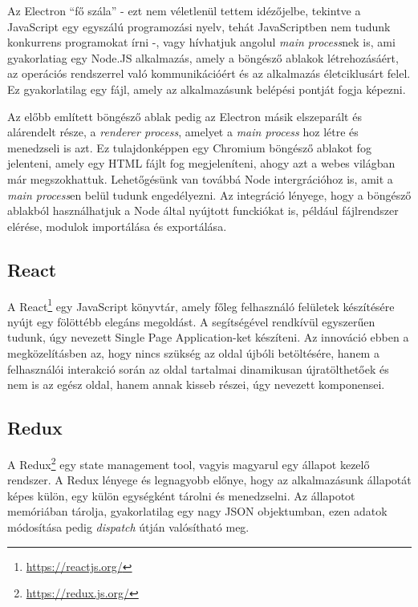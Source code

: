 Az Electron ``fő szála'' - ezt nem véletlenül tettem idézőjelbe, tekintve a JavaScript egy egyszálú programozási nyelv, tehát JavaScriptben nem tudunk konkurrens programokat írni -, vagy hívhatjuk angolul {\it main process}nek is, ami gyakorlatiag egy Node.JS alkalmazás, amely a böngésző ablakok létrehozásáért, az operációs rendszerrel való kommunikációért és az alkalmazás életciklusárt felel. Ez gyakorlatilag egy fájl, amely az alkalmazásunk belépési pontját fogja képezni.

Az előbb említett böngésző ablak pedig az Electron másik elszeparált és alárendelt része, a {\it renderer process}, amelyet a {\it main process} hoz létre és menedzseli is azt. Ez tulajdonképpen egy Chromium böngésző ablakot fog jelenteni, amely egy HTML fájlt fog megjeleníteni, ahogy azt a webes világban már megszokhattuk. Lehetőgésünk van továbbá Node intergrációhoz is, amit a {\it main process}en belül tudunk engedélyezni. Az integráció lényege, hogy a böngésző ablakból használhatjuk a Node által nyújtott funckiókat is, például fájlrendszer elérése, modulok importálása és exportálása.

\subsection{React}
A React\footnote{\url{https://reactjs.org/}} egy JavaScript könyvtár, amely főleg felhasználó felületek készítésére nyújt egy fölöttébb elegáns megoldást. A segítségével rendkívül egyszerűen tudunk, úgy nevezett Single Page Application-ket készíteni. Az innováció ebben a megközelításben az, hogy nincs szükség az oldal újbóli betöltésére, hanem a felhasználói interakció során az oldal tartalmai dinamikusan újratölthetőek és nem is az egész oldal, hanem annak kisseb részei, úgy nevezett komponensei.

\subsection{Redux}
A Redux\footnote{\url{https://redux.js.org/}} egy state management tool, vagyis magyarul egy állapot kezelő rendszer. A Redux lényege és legnagyobb előnye, hogy az alkalmazásunk állapotát képes külön, egy külön egységként tárolni és menedzselni. Az állapotot memóriában tárolja, gyakorlatilag egy nagy JSON objektumban, ezen adatok módosítása pedig {\it dispatch} útján valósítható meg.

